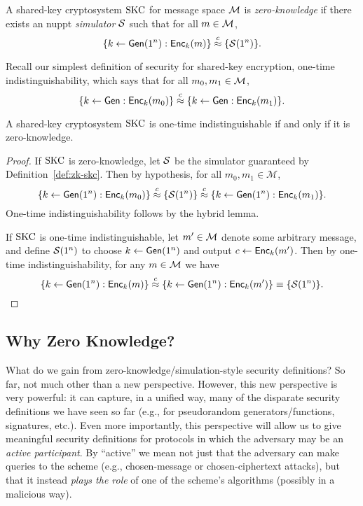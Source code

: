 \documentclass[11pt]{article}
\begin{document}
\begin{definition}
  \label{def:zk-skc}
  A shared-key cryptosystem $\text{SKC}$ for message space $\mathcal{M}$ is
  \emph{zero-knowledge} if there exists an nuppt \emph{simulator}
  $\mathcal{S}$ such that for all $m \in \mathcal{M}$, \[ \{k \gets
    \mathsf{Gen}(1^{n}) : \mathsf{Enc}_{k}(m)\} \stackrel{c}{\approx} \{\mathcal{S}(1^{n})\}. \]
\end{definition}

Recall our simplest definition of security for shared-key encryption,
one-time indistinguishability, which says that for all $m_{0}, m_{1}
\in \mathcal{M}$, \[ \{k \gets \mathsf{Gen} : \mathsf{Enc}_{k}(m_{0})\} \stackrel{c}{\approx}
\{k \gets \mathsf{Gen} : \mathsf{Enc}_{k}(m_{1})\}. \]

\begin{theorem}
  \label{thm:zk-iff-indist}
  A shared-key cryptosystem $\text{SKC}$ is one-time indistinguishable if
  and only if it is zero-knowledge.
\end{theorem}

\begin{proof}
  If $\text{SKC}$ is zero-knowledge, let $\mathcal{S}$ be the simulator guaranteed
  by Definition~\ref{def:zk-skc}.  Then by hypothesis, for all $m_{0},
  m_{1} \in \mathcal{M}$,
  \[ \{k \gets \mathsf{Gen}(1^{n}): \mathsf{Enc}_{k}(m_0)\} \stackrel{c}{\approx}
  \{\mathcal{S}(1^{n})\} \stackrel{c}{\approx} \{k \gets \mathsf{Gen}(1^{n}) :
    \mathsf{Enc}_{k}(m_1)\}. \] One-time indistinguishability follows by the
  hybrid lemma.

  If $\text{SKC}$ is one-time indistinguishable, let $m' \in \mathcal{M}$
  denote some arbitrary message, and define $\mathcal{S}(1^{n})$ to choose $k
  \gets \mathsf{Gen}(1^{n})$ and output $c \gets \mathsf{Enc}_{k}(m')$.  Then by
  one-time indistinguishability, for any $m \in \mathcal{M}$ we have
  \[ \{k \gets \mathsf{Gen}(1^{n}): \mathsf{Enc}_{k}(m)\} \stackrel{c}{\approx} \{k
    \gets \mathsf{Gen}(1^{n}) : \mathsf{Enc}_{k}(m')\} \equiv
  \{\mathcal{S}(1^{n})\}. \qedhere \]
\end{proof}

\subsection{Why Zero Knowledge?}
\label{sec:why-zero-knowledge}

What do we gain from zero-knowledge/simulation-style security
definitions?  So far, not much other than a new perspective.  However,
this new perspective is very powerful: it can capture, in a unified
way, many of the disparate security definitions we have seen so far
(e.g., for pseudorandom generators/functions, signatures, etc.).  Even
more importantly, this perspective will allow us to give meaningful
security definitions for protocols in which the adversary may be an
\emph{active participant}.  By ``active'' we mean not just that the
adversary can make queries to the scheme (e.g., chosen-message or
chosen-ciphertext attacks), but that it instead \emph{plays the role}
of one of the scheme's algorithms (possibly in a malicious way).
\end{document}

